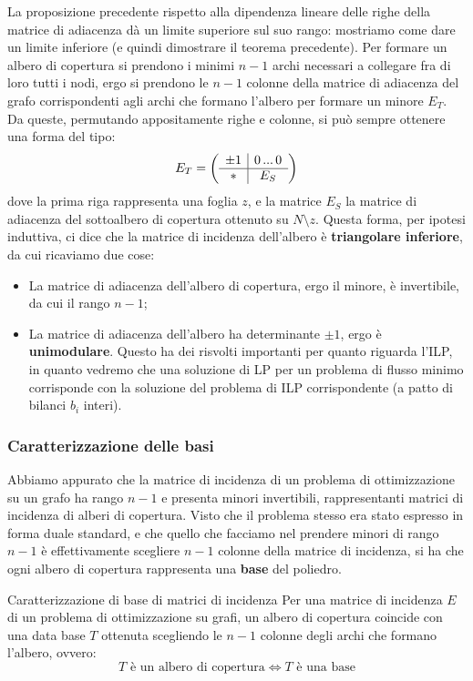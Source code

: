 \documentclass[a4paper,11pt]{article}
\begin{document}
La proposizione precedente rispetto alla dipendenza lineare delle righe della matrice di adiacenza dà un limite superiore sul suo rango: mostriamo come dare un limite inferiore (e quindi dimostrare il teorema precedente). 
Per formare un albero di copertura si prendono i minimi $n-1$ archi necessari a collegare fra di loro tutti i nodi, ergo si prendono le $n-1$ colonne della matrice di adiacenza del grafo corrispondenti agli archi che formano l'albero per formare un minore $E_T$.
Da queste, permutando appositamente righe e colonne, si può sempre ottenere una forma del tipo:
$$
E_T =
\left(\begin{array}{ c | c  }
		\pm 1 & 0 \, ... \,  0 \\
	\hline
		* & E_S
\end{array}\right)
$$
dove la prima riga rappresenta una foglia $z$, e la matrice $E_S$ la matrice di adiacenza del sottoalbero di copertura ottenuto su $N \setminus z$.
Questa forma, per ipotesi induttiva, ci dice che la matrice di incidenza dell'albero è \textbf{triangolare inferiore}, da cui ricaviamo due cose:
\begin{itemize}
	\item La matrice di adiacenza dell'albero di copertura, ergo il minore, è invertibile, da cui il rango $n-1$;
	\item La matrice di adiacenza dell'albero ha determinante $\pm 1$, ergo è \textbf{unimodulare}.
		Questo ha dei risvolti importanti per quanto riguarda l'ILP, in quanto vedremo che una soluzione di LP per un problema di flusso minimo corrisponde con la soluzione del problema di ILP corrispondente (a patto di bilanci $b_i$ interi).
\end{itemize}

\subsubsection{Caratterizzazione delle basi}
Abbiamo appurato che la matrice di incidenza di un problema di ottimizzazione su un grafo ha rango $n-1$ e presenta minori invertibili, rappresentanti matrici di incidenza di alberi di copertura.
Visto che il problema stesso era stato espresso in forma duale standard, e che quello che facciamo nel prendere minori di rango $n-1$ è effettivamente scegliere $n-1$ colonne della matrice di incidenza, si ha che ogni albero di copertura rappresenta una \textbf{base} del poliedro.

\begin{theorem}{Caratterizzazione di base di matrici di incidenza}
	Per una matrice di incidenza $E$ di un problema di ottimizzazione su grafi, un albero di copertura coincide con una data base $T$ ottenuta scegliendo le $n-1$ colonne degli archi che formano l'albero, ovvero:
	$$
	T \text{ è un albero di copertura} \Leftrightarrow T \text{ è una base}
	$$
\end{theorem}
\end{document}
